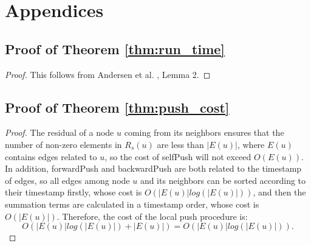 \section{Appendices}

\subsection{Proof of Theorem \ref{thm:run_time}}
\begin{proof}
This follows from Andersen et al. \cite{andersen2006local}, Lemma 2.
\end{proof}

\subsection{Proof of Theorem \ref{thm:push_cost}}
\begin{proof}
The residual of a node $u$ coming from its neighbors ensures that the number of non-zero elements in $R_s(u)$ are less than $|E(u)|$, where $E(u)$ contains edges related to $u$, so the cost of selfPush will not exceed $O(E(u))$.
In addition, forwardPush and backwardPush are both related to the timestamp of edges, so all edges among node $u$ and its neighbors can be sorted according to their timestamp firstly, whose cost is $O(|E(u)|log(|E(u)|))$, and then the summation terms are calculated in a timestamp order, whose cost is $O(|E(u)|)$.
Therefore, the cost of the local push procedure is:
\begin{equation}
    O( |E(u)|log(|E(u)|) + |E(u)| ) = O(|E(u)|log(|E(u)|)).
\end{equation}
\end{proof}

